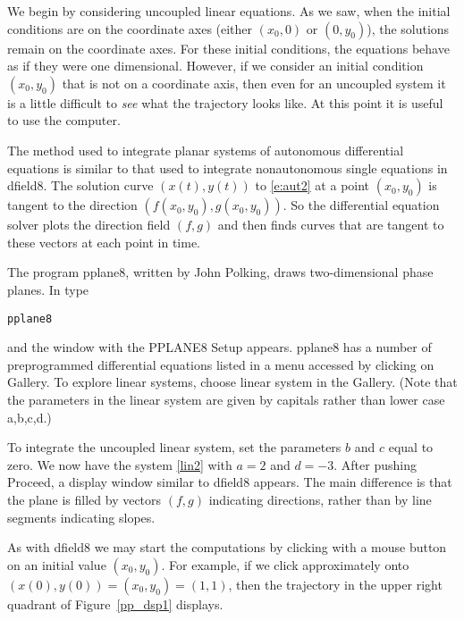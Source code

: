 \documentclass{ximera}
\begin{document}
We begin by considering uncoupled linear equations.  As we saw,
when the initial conditions are on the coordinate axes (either
$(x_0,0)$ or $(0,y_0)$), the solutions remain on the coordinate
axes.  For these initial conditions, the equations behave as if
they were one dimensional.  However, if we consider an initial
condition $(x_0,y_0)$ that is not on a coordinate axis, then even
for an uncoupled system it is a little difficult to
{\em see\/} what the trajectory looks like.  At this point
it is useful to use the computer.

The method used to integrate planar systems of autonomous
differential equations is similar to that used to integrate
nonautonomous single equations in {\sf dfield8}.  The solution
curve $(x(t),y(t))$ to \eqref{e:aut2} at a point $(x_0,y_0)$ is
tangent to the direction $(f(x_0,y_0),g(x_0,y_0))$.  So
the differential equation solver plots the direction field
$(f,g)$ and then finds curves that are tangent to these
vectors at each point in time.

The program {\sf pplane8}, written by John
Polking, draws two-dimensional phase planes.  
In \Matlab type
\begin{verbatim}
pplane8
\end{verbatim}
and the window with the {\sf PPLANE8 Setup} appears. {\sf pplane8}
has a number of preprogrammed differential equations listed in a
menu accessed by clicking on {\sf Gallery}.  To explore linear
systems, choose {\sf linear system} in the {\sf Gallery}.  (Note that the 
parameters in the {\sf linear system} are given by capitals rather than 
lower case {\sf a,b,c,d}.)

To integrate the uncoupled linear system, set the parameters $b$
and $c$ equal to zero. We now have the system \eqref{lin2} with
$a = 2$ and $d = -3$.  After pushing {\sf Proceed}, a display window
similar to {\sf dfield8} appears.  The main difference is that
the plane is filled by vectors $(f,g)$ indicating directions,
rather than by line segments indicating slopes.

As with {\sf dfield8} we may start the computations by clicking
with a mouse button on an initial value $(x_0,y_0)$.  For example,
if we click approximately onto $(x(0),y(0))=(x_0,y_0)=(1,1)$, then
the trajectory in the upper right quadrant of
Figure~\ref{pp_dsp1} displays.

\begin{figure*}[htb]
     \centerline{%
     }
     \caption{{\sf PPLANE8 Display} for \protect\eqref{lin2} with
             $a=2$, $d=-3$ and $x,y\in [-5,5]$. Solutions
             going through $(\pm 1,\pm 1)$ are shown.}
     \label{pp_dsp1}
\end{figure*}
\end{document}
